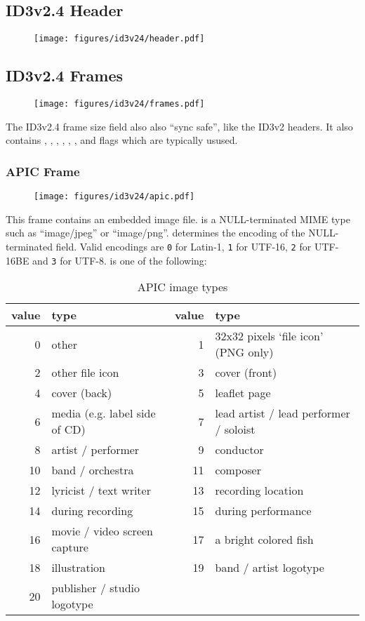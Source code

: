 \clearpage

\subsection{ID3v2.4 Header}
\begin{figure}[h]
\texttt{[image: figures/id3v24/header.pdf]}
\end{figure}

\subsection{ID3v2.4 Frames}
\begin{figure}[h]
  \texttt{[image: figures/id3v24/frames.pdf]}
\end{figure}
\par
\noindent
The ID3v2.4 frame size field also also ``sync safe'', like the ID3v2 headers.
It also contains , , ,
, , , 
and  flags which are typically usused.

\clearpage

\subsubsection{APIC Frame}
\begin{figure}[h]
\texttt{[image: figures/id3v24/apic.pdf]}
\end{figure}
\par
\noindent
This frame contains an embedded image file.
 is a NULL-terminated MIME type such as ``image/jpeg''
or ``image/png''.
 determines the encoding of the NULL-terminated
 field.
Valid encodings are \texttt{0} for Latin-1,
\texttt{1} for UTF-16,
\texttt{2} for UTF-16BE
and \texttt{3} for UTF-8.
 is one of the following:
\begin{table}[h]
{
\begin{tabular}{|r|l||r|l|}
\hline
value & type & value & type \\
\hline
0 & other & 1 & 32x32 pixels `file icon' (PNG only) \\
2 & other file icon & 3 & cover (front) \\
4 & cover (back) & 5 & leaflet page \\
6 & media (e.g. label side of CD) & 7 & lead artist / lead performer / soloist \\
8 & artist / performer & 9 & conductor \\
10 & band / orchestra & 11 & composer \\
12 & lyricist / text writer & 13 & recording location \\
14 & during recording & 15 & during performance \\
16 & movie / video screen capture & 17 & a bright colored fish \\
18 & illustration & 19 & band / artist logotype \\
20 & publisher / studio logotype & &  \\
\hline
\end{tabular}
\caption{APIC image types}
}
\end{table}

